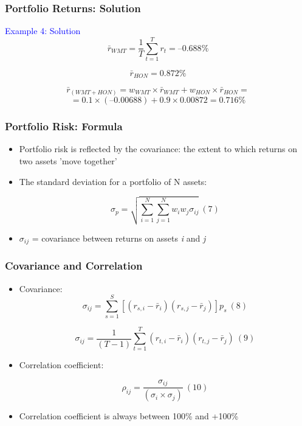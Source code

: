 \documentclass[9pt,aspectratio=169]{beamer}
\begin{document}
\begin{frame}
\frametitle{\textnormal{Portfolio Returns: Solution}}

\textcolor{blue}{Example 4: Solution}
\\

$$\bar{r}_{WMT} = \frac{1}{T} \sum_{t=1}^{T} r_t = \text{--}0.688\%
$$

$$\bar{r}_{HON} = 0.872\%$$

$$
\bar{r}_{(WMT+HON)} = w_{WMT} \times \bar{r}_{WMT} + w_{HON} \times \bar{r}_{HON} =
$$
$$
=0.1 \times (\text{--}0.00688)+0.9 \times 0.00872=0.716\%
$$

\end{frame}

\begin{frame}
\frametitle{\textnormal{Portfolio Risk: Formula}}

\begin{itemize}
    \item Portfolio risk is reflected by the covariance: the extent to which returns on two assets 'move together'
\item The standard deviation for a portfolio of N assets:

$$   \sigma_p = \sqrt{\sum_{i=1}^{N} \sum_{j=1}^{N} w_i w_j \sigma_{ij}  }  \ (7) $$

\item $\sigma_{ij}$ = covariance between returns on assets \textit{i} and \textit{j}

\end{itemize}

\end{frame}

\begin{frame}
\frametitle{\textnormal{Covariance and Correlation}}

\begin{itemize}
\item Covariance:
$$    \sigma_{ij}=\sum_{s=1}^{S}[(r_{s,i}- \bar{r}_i)(r_{s,j}-\bar{r}_j)] p_s \ (8)$$

$$    \sigma_{ij}=\frac{1}{(T-1)} \sum_{t=1}^{T}(r_{t,i}-\bar{r}_i)(r_{t,j}-\bar{r}_j) \ (9) $$


\item Correlation coefficient:

$$
    \rho_{ij}=\frac{\sigma_{ij}}{(\sigma_i \times \sigma_j)} \ (10) $$

\item Correlation coefficient is always between \text{--}100\% and +100\%

\end{itemize}

\end{frame}
\end{document}
